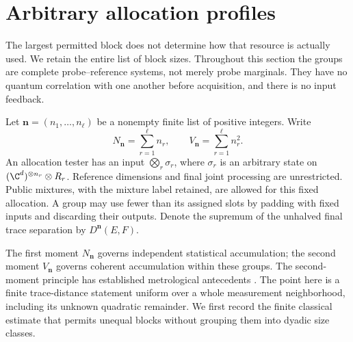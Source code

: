 \section{Arbitrary allocation profiles}
\label{sec:allocation88}
The largest permitted block does not determine how that resource is
actually used.  We retain the entire list of block sizes.  Throughout
this section the groups are complete probe--reference systems, not
merely probe marginals.  They have no quantum correlation with one
another before acquisition, and there is no input feedback.

\begin{definition}\label{def:allocation88}
Let $\boldsymbol n=(n_1,\ldots,n_\ell)$ be a nonempty finite list of
positive integers.  Write
\[
 N_{\boldsymbol n}=\sum_{r=1}^{\ell}n_r,
 \qquad V_{\boldsymbol n}=\sum_{r=1}^{\ell}n_r^2.
\]
An allocation tester has an input
$\bigotimes_r\sigma_r$, where $\sigma_r$ is an arbitrary state on
$(\C^d)^{\otimes n_r}\otimes R_r$.  Reference dimensions and final
joint processing are unrestricted.  Public mixtures, with the
mixture label retained, are allowed for this fixed allocation.
A group may use fewer than its assigned slots by padding with fixed
inputs and discarding their outputs.  Denote the supremum of the
unhalved final trace separation by $D^{\boldsymbol n}(E,F)$.
\end{definition}

The first moment $N_{\boldsymbol n}$ governs independent statistical
accumulation; the second moment $V_{\boldsymbol n}$ governs coherent
accumulation within these groups.  The second-moment principle has
established metrological antecedents \cite{Hyllus78,Toth78}.  The point
here is a finite trace-distance statement uniform over a whole
measurement neighborhood, including its unknown quadratic remainder.
We first record the finite classical estimate that permits unequal
blocks without grouping them into dyadic size classes.

